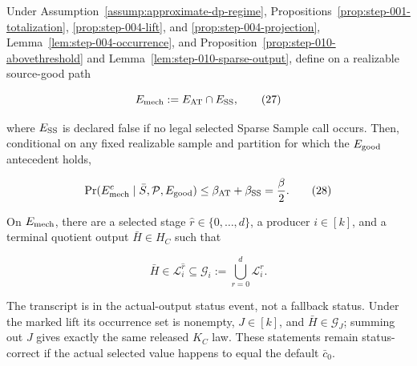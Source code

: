 \begin{proposition}\label{prop:step-010-mechanism-good}
Under Assumption~\ref{assump:approximate-dp-regime}, 
Propositions~\ref{prop:step-001-totalization},
\ref{prop:step-004-lift}, and \ref{prop:step-004-projection}, Lemma~\ref{lem:step-004-occurrence}, and
Proposition~\ref{prop:step-010-abovethreshold} and
Lemma~\ref{lem:step-010-sparse-output}, define on a realizable source-good
path

\[
 E_{\rm mech}:=E_{\rm AT}\cap E_{\rm SS},
 \tag{27}
\]

where \(E_{\rm SS}\) is declared false if no legal selected Sparse Sample
call occurs. Then, conditional on any fixed realizable sample and partition
for which the  \(E_{\rm good}\) antecedent holds,

\[
 \Pr(E_{\rm mech}^c\mid\bar S,\mathcal P,E_{\rm good})
 \leq\beta_{\rm AT}+\beta_{\rm SS}
 =\frac{\beta}{2}.
 \tag{28}
\]

On \(E_{\rm mech}\), there are a selected stage
\(\widehat r\in\{0,\ldots,d\}\), a producer \(i\in[k]\), and a terminal
quotient output \(\bar H\in H_C\) such that

\[
 \bar H\in\mathcal L_i^{\widehat r}
 \subseteq\mathcal G_i
 :=\bigcup_{r=0}^d\mathcal L_i^r.
 \tag{29}
\]

The transcript is in the  actual-output status event, not a
fallback status. Under the marked lift its occurrence set is nonempty,
\(J\in[k]\), and \(\bar H\in\mathcal G_J\); summing out \(J\) gives exactly
the same released \(K_C\) law. These statements remain status-correct if
the actual selected value happens to equal the default \(\bar c_0\).


\end{proposition}


